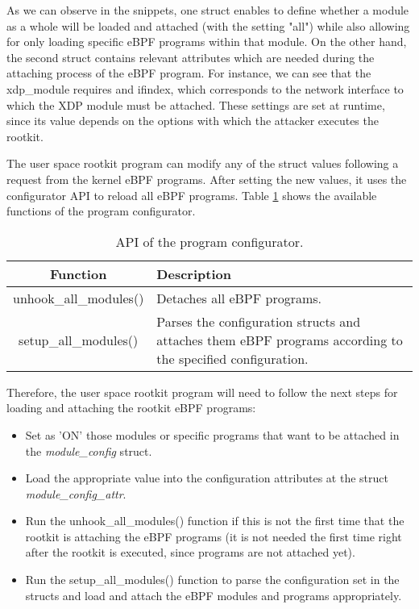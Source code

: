 As we can observe in the snippets, one struct enables to define whether a module as a whole will be loaded and attached (with the setting "all") while also allowing for only loading specific eBPF programs within that module. On the other hand, the second struct contains relevant attributes which are needed during the attaching process of the eBPF program. For instance, we can see that the xdp\_module requires and ifindex, which corresponds to the network interface to which the XDP module must be attached. These settings are set at runtime, since its value depends on the options with which the attacker executes the rootkit.

The user space rootkit program can modify any of the struct values following a request from the kernel eBPF programs. After setting the new values, it uses the configurator API to reload all eBPF programs. Table \ref{table:configurator_api} shows the available functions of the program configurator.

\begin{table}[htbp]
\begin{tabular}{|c|>{\centering\arraybackslash}p{10cm}|}
\hline
\textbf{Function} & \textbf{Description} \\
\hline
\hline
unhook\_all\_modules() & Detaches all eBPF programs.\\
\hline
setup\_all\_modules() & Parses the configuration structs and attaches them eBPF programs according to the specified configuration.\\
\hline
\end{tabular}
\caption{API of the program configurator.}
\label{table:configurator_api}
\end{table}

Therefore, the user space rootkit program will need to follow the next steps for loading and attaching the rootkit eBPF programs:
\begin{itemize}
\item Set as 'ON' those modules or specific programs that want to be attached in the \textit{module\_config} struct.
\item Load the appropriate value into the configuration attributes at the struct \textit{module\_config\_attr}.
\item Run the unhook\_all\_modules() function if this is not the first time that the rootkit is attaching the eBPF programs (it is not needed the first time right after the rootkit is executed, since programs are not attached yet).
\item Run the setup\_all\_modules() function to parse the configuration set in the structs and load and attach the eBPF modules and programs appropriately.
\end{itemize}

